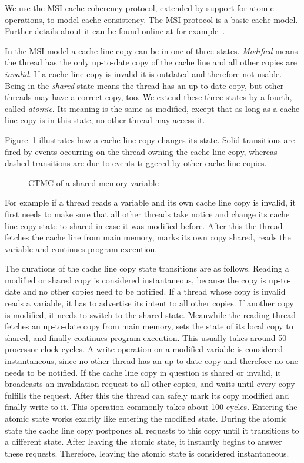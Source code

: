 \documentclass[a4paper, 10pt]{article}
\begin{document}
We use the MSI cache coherency protocol, extended by support for atomic operations, to model cache consistency. The MSI protocol is a basic cache model. Further details about it can be found online at for example~\cite{msi}.

In the MSI model a cache line copy can be in one of three states. \emph{Modified} means the thread has the only up-to-date copy of the cache line and all other copies are \emph{invalid}. If a cache line copy is invalid it is outdated and therefore not usable. Being in the \emph{shared} state means the thread has an up-to-date copy, but other threads may have a correct copy, too. We extend these three states by a fourth, called \emph{atomic}. Its meaning is the same as modified, except that as long as a cache line copy is in this state, no other thread may access it.

Figure~\ref{fig:model-shared-memory} illustrates how a cache line copy changes its state. Solid transitions are fired by events occurring on the thread owning the cache line copy, whereas dashed transitions are due to events triggered by other cache line copies.

\begin{figure}[htbp]
	\centering
	
	\caption{CTMC of a shared memory variable}
	\label{fig:model-shared-memory}
\end{figure}

For example if a thread reads a variable and its own cache line copy is invalid, it first needs to make sure that all other threads take notice and change its cache line copy state to shared in case it was modified before. After this the thread fetches the cache line from main memory, marks its own copy shared, reads the variable and continues program execution.

The durations of the cache line copy state transitions are as follows.
Reading a modified or shared copy is considered instantaneous, because the copy is up-to-date and no other copies need to be notified.
If a thread whose copy is invalid reads a variable, it has to advertise its intent to all other copies. If another copy is modified, it needs to switch to the shared state. Meanwhile the reading thread fetches an up-to-date copy from main memory, sets the state of its local copy to shared, and finally continues program execution. This usually takes around 50 processor clock cycles.
A write operation on a modified variable is considered instantaneous, since no other thread has an up-to-date copy and therefore no one needs to be notified.
If the cache line copy in question is shared or invalid, it broadcasts an invalidation request to all other copies, and waits until every copy fulfills the request. After this the thread can safely mark its copy modified and finally write to it. This operation commonly takes about 100 cycles.
Entering the atomic state works exactly like entering the modified state.
During the atomic state the cache line copy postpones all requests to this copy until it transitions to a different state. After leaving the atomic state, it instantly begins to answer these requests. Therefore, leaving the atomic state is considered instantaneous.
\end{document}
